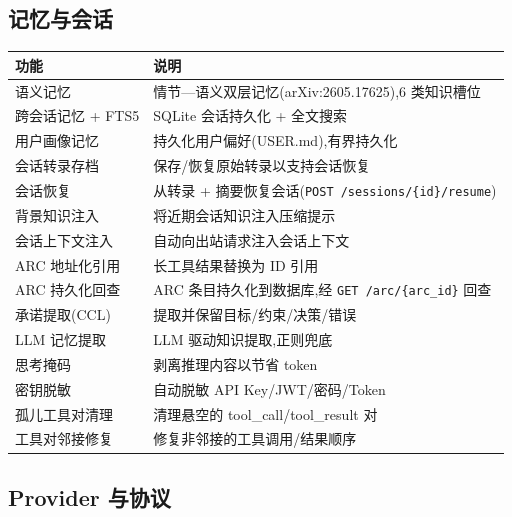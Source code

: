 \documentclass[11pt,a4paper]{article}
\begin{document}
\subsection{记忆与会话}

\begin{longtable}{@{}lp{10cm}@{}}
  \toprule
  功能 & 说明 \\
  \midrule
  语义记忆 & 情节—语义双层记忆(arXiv:2605.17625),6 类知识槽位 \\
  跨会话记忆 + FTS5 & SQLite 会话持久化 + 全文搜索 \\
  用户画像记忆 & 持久化用户偏好(USER.md),有界持久化 \\
  会话转录存档 & 保存/恢复原始转录以支持会话恢复 \\
  会话恢复 & 从转录 + 摘要恢复会话(\texttt{POST /sessions/\{id\}/resume}) \\
  背景知识注入 & 将近期会话知识注入压缩提示 \\
  会话上下文注入 & 自动向出站请求注入会话上下文 \\
  ARC 地址化引用 & 长工具结果替换为 ID 引用 \\
  ARC 持久化回查 & ARC 条目持久化到数据库,经 \texttt{GET /arc/\{arc\_id\}} 回查 \\
  承诺提取(CCL) & 提取并保留目标/约束/决策/错误 \\
  LLM 记忆提取 & LLM 驱动知识提取,正则兜底 \\
  思考掩码 & 剥离推理内容以节省 token \\
  密钥脱敏 & 自动脱敏 API Key/JWT/密码/Token \\
  孤儿工具对清理 & 清理悬空的 tool\_call/tool\_result 对 \\
  工具对邻接修复 & 修复非邻接的工具调用/结果顺序 \\
  \bottomrule
\end{longtable}

\subsection{Provider 与协议}
\end{document}
